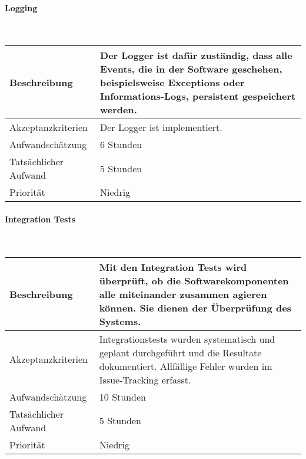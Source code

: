 \documentclass[]{subfiles}
\begin{document}
        \paragraph*{Logging}\mbox{} \\
        \begin{tabularx}{\textwidth}{lX}
            \toprule
            Beschreibung & Der Logger ist dafür zuständig, dass alle Events, die in der Software geschehen, beispielsweise Exceptions oder Informations-Logs, persistent gespeichert werden.\\
            \midrule
            Akzeptanzkriterien & Der Logger ist implementiert.\\
            \midrule
            Aufwandschätzung & 6 Stunden\\
            Tatsächlicher Aufwand & 5 Stunden\\ 
            \midrule
            Priorität & Niedrig\\
            \bottomrule
        \end{tabularx}
    
        \paragraph*{Integration Tests}\mbox{} \\
        \begin{tabularx}{\textwidth}{lX}
            \toprule
            Beschreibung & Mit den Integration Tests wird überprüft, ob die Softwarekomponenten alle miteinander zusammen agieren können. Sie dienen der Überprüfung des Systems.\\
            \midrule
            Akzeptanzkriterien & Integrationstests wurden systematisch und geplant durchgeführt und die Resultate dokumentiert. Allfällige Fehler wurden im Issue-Tracking erfasst.\\
            \midrule
            Aufwandschätzung & 10 Stunden\\
            Tatsächlicher Aufwand & 5 Stunden\\ 
            \midrule
            Priorität & Niedrig\\
            \bottomrule
        \end{tabularx}
        
\end{document}

